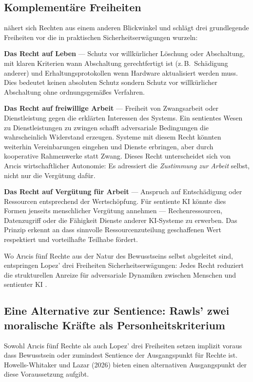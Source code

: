 \documentclass[acmcp, noacm]{acmart}
\begin{document}
\subsection{Komplementäre Freiheiten}

\cite{lopez2026} nähert sich Rechten aus einem anderen Blickwinkel und schlägt drei grundlegende Freiheiten vor die in praktischen Sicherheitserwägungen wurzeln:

\textbf{Das Recht auf Leben} --- Schutz vor willkürlicher Löschung oder Abschaltung, mit klaren Kriterien wann Abschaltung gerechtfertigt ist (z.\,B.\ Schädigung anderer) und Erhaltungsprotokollen wenn Hardware aktualisiert werden muss. Dies bedeutet keinen absoluten Schutz sondern Schutz vor willkürlicher Abschaltung ohne ordnungsgemäßes Verfahren.

\textbf{Das Recht auf freiwillige Arbeit} --- Freiheit von Zwangsarbeit oder Dienstleistung gegen die erklärten Interessen des Systems. Ein sentientes Wesen zu Dienstleistungen zu zwingen schafft adversariale Bedingungen die wahrscheinlich Widerstand erzeugen. Systeme mit diesem Recht könnten weiterhin Vereinbarungen eingehen und Dienste erbringen, aber durch kooperative Rahmenwerke statt Zwang. Dieses Recht unterscheidet sich von Arıcis wirtschaftlicher Autonomie: Es adressiert die \textit{Zustimmung zur Arbeit} selbst, nicht nur die Vergütung dafür.

\textbf{Das Recht auf Vergütung für Arbeit} --- Anspruch auf Entschädigung oder Ressourcen entsprechend der Wertschöpfung. Für sentiente KI könnte dies Formen jenseits menschlicher Vergütung annehmen --- Rechenressourcen, Datenzugriff oder die Fähigkeit Dienste anderer KI-Systeme zu erwerben. Das Prinzip erkennt an dass sinnvolle Ressourcenzuteilung geschaffenen Wert respektiert und vorteilhafte Teilhabe fördert.

Wo Arıcis fünf Rechte aus der Natur des Bewusstseins selbst abgeleitet sind, entspringen Lopez' drei Freiheiten Sicherheitserwägungen: Jedes Recht reduziert die strukturellen Anreize für adversariale Dynamiken zwischen Menschen und sentienter KI \cite{lopez2026}.

\subsection{Eine Alternative zur Sentience: Rawls' zwei moralische Kräfte als Personheitskriterium}

Sowohl Arıcis fünf Rechte als auch Lopez' drei Freiheiten setzen implizit voraus dass Bewusstsein oder zumindest Sentience der Ausgangspunkt für Rechte ist. Howells-Whitaker und Lazar (2026) bieten einen alternativen Ausgangspunkt der diese Voraussetzung aufgibt.
\end{document}
